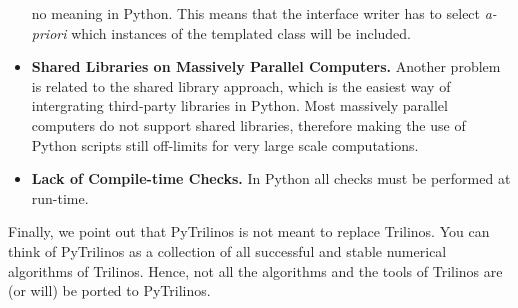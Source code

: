 \documentclass[10pt,relax]{SANDreport}
\begin{document}
\begin{itemize}
no meaning in Python. This means that the interface writer has to select {\sl
  a-priori} which instances of the templated class will be included.
%
\item {\bf Shared Libraries on Massively Parallel Computers.} Another problem
is related to the shared library approach, which is the easiest way of
intergrating third-party libraries in Python. Most massively parallel
computers do not support shared libraries, therefore making the use of Python
scripts still off-limits for very large scale computations.
%
\item {\bf Lack of Compile-time Checks.} In Python all checks must be
performed at run-time.
\end{itemize}

Finally, we point out that PyTrilinos is not meant to replace Trilinos. You
can think of PyTrilinos as a collection of all successful and stable
numerical algorithms of Trilinos.  Hence, not all the algorithms and the tools
of Trilinos are (or will) be ported to PyTrilinos. 



\end{document}

